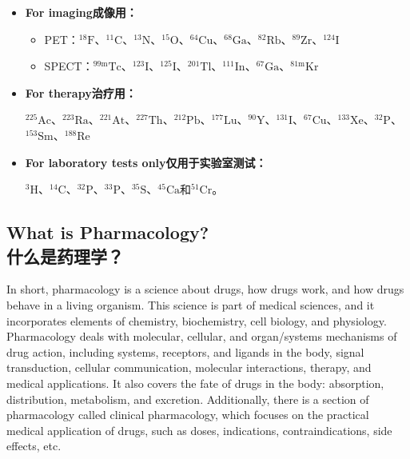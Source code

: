 \documentclass[dvipsnames, svgnames,a4paper,11pt]{article}
\begin{document}
\begin{itemize}

      \item \textbf{For imaging成像用：}

            \begin{itemize}

                  \item PET：${}^\text{18}\text{F}$、${}^\text{11}\text{C}$、${}^\text{13}\text{N}$、${}^\text{15}\text{O}$、${}^\text{64}\text{Cu}$、${}^\text{68}\text{Ga}$、${}^\text{82}\text{Rb}$、${}^\text{89}\text{Zr}$、${}^\text{124}\text{I}$

                  \item SPECT：${}^\text{99m}\text{Tc}$、${}^\text{123}\text{I}$、${}^\text{125}\text{I}$、${}^\text{201}\text{Tl}$、${}^\text{111}\text{In}$、${}^\text{67}\text{Ga}$、${}^\text{81m}\text{Kr}$

            \end{itemize}

      \item \textbf{For therapy治疗用：}

            ${}^\text{225}\text{Ac}$、${}^\text{223}\text{Ra}$、${}^\text{221}\text{At}$、${}^\text{227}\text{Th}$、${}^\text{212}\text{Pb}$、${}^\text{177}\text{Lu}$、${}^\text{90}\text{Y}$、${}^\text{131}\text{I}$、${}^\text{67}\text{Cu}$、${}^\text{133}\text{Xe}$、${}^\text{32}\text{P}$、${}^\text{153}\text{Sm}$、${}^\text{188}\text{Re}$

      \item \textbf{For laboratory tests only仅用于实验室测试：}

            ${}^\text{3}\text{H}$、${}^\text{14}\text{C}$、${}^\text{32}\text{P}$、${}^\text{33}\text{P}$、${}^\text{35}\text{S}$、${}^\text{45}\text{Ca}$和${}^\text{51}\text{Cr}$。


\end{itemize}

\subsection{What is Pharmacology?\\什么是药理学？}

In short, pharmacology is a science about drugs, how drugs work, and how drugs behave in a living organism. This science is part of medical sciences, and it incorporates elements of chemistry, biochemistry, cell biology, and physiology. Pharmacology deals with molecular, cellular, and organ/systems mechanisms of drug action, including systems, receptors, and ligands in the body, signal transduction, cellular communication, molecular interactions, therapy, and medical applications. It also covers the fate of drugs in the body: absorption, distribution, metabolism, and excretion. Additionally, there is a section of pharmacology called clinical pharmacology, which focuses on the practical medical application of drugs, such as doses, indications, contraindications, side effects, etc.
\end{document}
